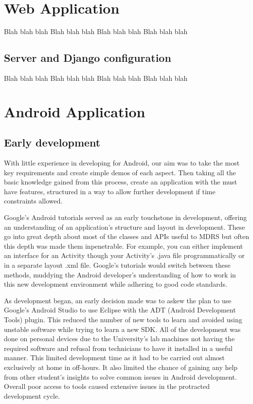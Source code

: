 \documentclass{l3proj}
\begin{document}
\section{Web Application}

Blah blah blah
Blah blah blah
Blah blah blah
Blah blah blah

\subsection{Server and Django configuration}

Blah blah blah
Blah blah blah
Blah blah blah
Blah blah blah

\section{Android Application}

\subsection{Early development} With little experience in developing for Android,
our aim was to take the most key requirements and create simple demos of each
aspect. Then taking all the basic knowledge gained from this process, create an
application with the must have features, structured in a way to allow further development if time constraints allowed.

Google's Android tutorials served as an early touchstone in development, offering an understanding of an application's structure and layout in development. These go into great depth about most of the classes and APIs useful to MDRS but often this depth was made them inpenetrable. For example, you can either implement an interface for an Activity though your Activity's .java file programmatically or in a separate layout .xml file. Google's tutorials would switch between these methods, muddying the Android developer's understanding of how to work in this new development environment while adhering to good code standards.

As development began, an early decision made was to askew the plan to use Google's Android Studio to use Eclipse with the ADT (Android Development Tools) plugin. This reduced the number of new tools to learn and avoided using unstable software while trying to learn a new SDK. All of the development was done on personal devices due to the University's lab machines not having the required software and refusal from technicians to have it installed in a useful manner. This limited development time as it had to be carried out almost exclusively at home in off-hours. It also limited the chance of gaining any help from other student's insights to solve common issues in Android development. Overall poor access to tools caused extensive issues in the protracted  development cycle.
\end{document}
